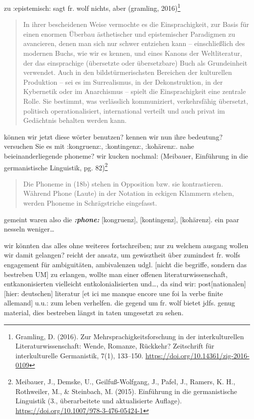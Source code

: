 \documentclass[
  letterpaper,
  DIV=11,
  numbers=noendperiod]{scrartcl}
\begin{document}
zu :epistemisch: sagt fr. wolf nichts, aber (gramling, 2016)\footnote{Gramling,
  D. (2016). Zur Mehrsprachigkeitsforschung in der interkulturellen
  Literaturwissenschaft: Wende, Romanze, Rückkehr? Zeitschrift für
  interkulturelle Germanistik, 7(1), 133--150.
  \url{https://doi.org/10.14361/zig-2016-0109}}

\begin{quote}
In ihrer bescheidenen Weise vermochte es die Einsprachigkeit, zur Basis
für einen enormen Überbau ästhetischer und epistemischer Paradigmen zu
avancieren, denen man sich nur schwer entziehen kann -- einschließlich
des modernen Buchs, wie wir es kennen, und eines Kanons der
Weltliteratur, der das einsprachige (übersetzte oder übersetzbare) Buch
als Grundeinheit verwendet. Auch in den bildstürmerischsten Bereichen
der kulturellen Produktion -- sei es im Surrealismus, in der
Dekonstruktion, in der Kybernetik oder im Anarchismus -- spielt die
Einsprachigkeit eine zentrale Rolle. Sie bestimmt, was verlässlich
kommuniziert, verkehrsfähig übersetzt, politisch operationalisiert,
international verteilt und auch privat im Gedächtnis behalten werden
kann.
\end{quote}

können wir jetzt diese wörter benutzen? kennen wir nun ihre bedeutung?
versuchen Sie es mit :kongruenz:, :kontingenz:, :kohärenz:. nahe
beieinanderliegende phoneme? wir kucken nochmal: (Meibauer, Einführung
in die germanistische Linguistik, pg. 82)\footnote{Meibauer, J., Demske,
  U., Geilfuß-Wolfgang, J., Pafel, J., Ramers, K. H., Rothweiler, M., \&
  Steinbach, M. (2015). Einführung in die germanistische Linguistik (3.,
  überarbeitete und aktualisierte Auflage).
  \url{https://doi.org/10.1007/978-3-476-05424-1}}

\begin{quote}
Die Phoneme in (18b) stehen in Opposition bzw. sie kontrastieren.
Während Phone (Laute) in der Notation in eckigen Klammern stehen, werden
Phoneme in Schrägstriche eingefasst.
\end{quote}

gemeint waren also die \textbf{\emph{:phone:}} {[}kongruenz{]},
{[}kontingenz{]}, {[}kohärenz{]}. ein paar nesseln weniger\ldots{}

wir könnten das alles ohne weiteres fortschreiben; nur zu welchem
ausgang wollen wir damit gelangen? reicht der ansatz, um gewisztheit
über zumindest fr. wolfs engagement für ambiguitäten, ambivalenzen udgl.
{[}nicht die begriffe, sondern das bestreben UM{]} zu erlangen, wollte
man einer offenen literaturwissenschaft, entkanonisierten vielleicht
entkolonialisierten und\ldots, da sind wir: post{[}nationalen{]}{[}hier:
deutschen{]} literatur {[}et ici me manque encore une foi la verbe
finite allemand{]} u.u.: zum leben verhelfen. die gegend um fr. wolf
bietet jdfs. genug material, dies bestreben längst in taten umgesetzt zu
sehen.
\end{document}
